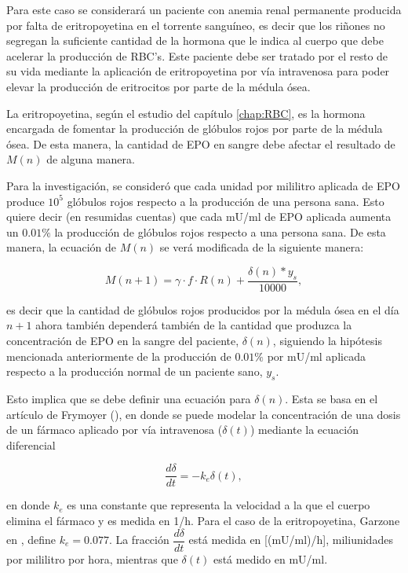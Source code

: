 Para este caso se considerará un paciente con anemia renal permanente producida por falta de eritropoyetina en el torrente sanguíneo, es decir que los riñones no segregan la suficiente cantidad de la hormona que le indica al cuerpo que debe acelerar la producción de RBC's. Este paciente debe ser tratado por el resto de su vida mediante la aplicación de eritropoyetina por vía intravenosa para poder elevar la producción de eritrocitos por parte de la médula ósea. 

La eritropoyetina, según el estudio del capítulo \ref{chap:RBC}, es la hormona encargada de fomentar la producción de glóbulos rojos por parte de la médula ósea. De esta manera, la cantidad de EPO en sangre debe afectar el resultado de $M(n)$ de alguna manera.

Para la investigación, se consideró que cada unidad por mililitro aplicada de EPO produce $10^{5}$ glóbulos rojos respecto a la producción de una persona sana. Esto quiere decir (en resumidas cuentas) que cada mU/ml de EPO aplicada aumenta un $0.01\%$ la producción de glóbulos rojos respecto a una persona sana. De esta manera, la ecuación de $M(n)$ se verá modificada de la siguiente manera: 

\begin{equation*}
    M(n+1)=\gamma\cdot f \cdot R(n)+\frac{\delta(n)*y_s}{10000},
\end{equation*}

es decir que la cantidad de glóbulos rojos producidos por la médula ósea en el día $n+1$ ahora también dependerá también de la cantidad que produzca la concentración de EPO en la sangre del paciente, $\delta(n)$, siguiendo la hipótesis mencionada anteriormente de la producción de $0.01\%$ por mU/ml aplicada respecto a la producción normal de un paciente sano, $y_s$. 

Esto implica que se debe definir una ecuación para $\delta(n)$. Esta se basa en el artículo de Frymoyer (\cite{FRYMOYER2019123}), en donde se puede modelar la concentración de una dosis de un fármaco aplicado por vía intravenosa ($\delta(t)$) mediante la ecuación diferencial

\begin{equation}\label{eq:diferencial}
    \dfrac{d\delta}{dt}=-k_e \delta(t),
\end{equation}

en donde $k_e$ es una constante que representa la velocidad a la que el cuerpo elimina el fármaco y es medida en 1/h. Para el caso de la eritropoyetina, Garzone en \cite{GARZONE2012547}, define $k_e=0.077$. La fracción $\dfrac{d\delta}{dt}$ está medida en [(mU/ml)/h], miliunidades por mililitro por hora, mientras que $\delta(t)$ está medido en mU/ml.

